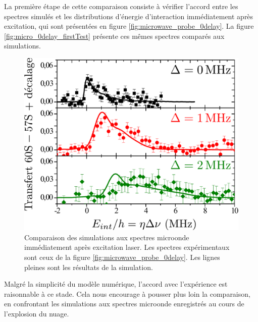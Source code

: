 La première étape de cette comparaison consiste à vérifier l'accord entre les spectres simulés et les distributions d'énergie d'interaction immédiatement après excitation, qui sont présentées en figure \eqref{fig:microwave_probe_0delay}.
La figure \eqref{fig:micro_0delay_firstTest} présente ces mêmes spectres comparés aux simulations.
%
\begin{figure}[h]
\centering
\includegraphics[width=.7\linewidth]{figures/low_l/micro_0delay_firstTest_Tigrane}
\caption[Comparaison des simulations aux spectres microonde immédiatement après excitation laser]{
Comparaison des simulations aux spectres microonde immédiatement après excitation laser.
Les spectres expérimentaux sont ceux de la figure \ref{fig:microwave_probe_0delay}.
Les lignes pleines sont les résultats de la simulation.
}
\label{fig:micro_0delay_firstTest}
\end{figure}
%
Malgré la simplicité du modèle numérique, l'accord avec l'expérience est raisonnable à ce stade.
Cela nous encourage à pousser plus loin la comparaison, en confrontant les simulations aux spectres microonde enregistrés au cours de l'explosion du nuage.

